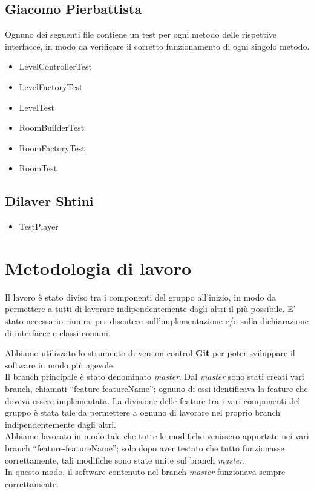 \documentclass[a4paper,12pt]{report}
\begin{document}
\subsection*{Giacomo Pierbattista}
Ognuno dei seguenti file contiene un test per ogni metodo delle rispettive interfacce, in modo da verificare
il corretto funzionamento di ogni singolo metodo.
\begin{itemize}
    \item LevelControllerTest
    \item LevelFactoryTest
    \item LevelTest
    \item RoomBuilderTest
    \item RoomFactoryTest
    \item RoomTest
\end{itemize}

\subsection*{Dilaver Shtini}
\begin{itemize}
    \item TestPlayer
\end{itemize}



\section{Metodologia di lavoro}
Il lavoro è stato diviso tra i componenti del gruppo all'inizio, in modo da permettere a tutti di
lavorare indipendentemente dagli altri il più possibile.
E' stato necessario riunirsi per discutere sull'implementazione e/o sulla dichiarazione di interfacce e
classi comuni.

Abbiamo utilizzato lo strumento di version control \textbf{Git} per poter sviluppare 
il software in modo più agevole.
\\Il branch principale è stato denominato \textit{master}.
Dal \textit{master} sono stati creati vari branch, chiamati ``feature-featureName''; 
ognuno di essi identificava la feature che doveva essere implementata. 
La divisione delle feature tra i vari componenti del gruppo è stata tale da permettere 
a ognuno di lavorare nel proprio branch indipendentemente dagli altri.
\\Abbiamo lavorato in modo tale che tutte le modifiche venissero apportate nei vari branch 
``feature-featureName''; solo dopo aver testato che tutto funzionasse correttamente, 
tali modifiche sono state unite sul branch \textit{master}.
\\In questo modo, il software contenuto nel branch \textit{master} funzionava sempre correttamente.
\end{document}
